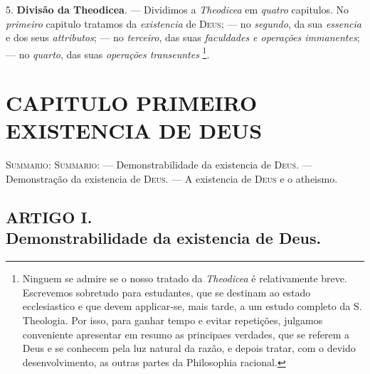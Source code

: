  5. \textbf{Divisão da Theodicea}. --- Dividimos a \emph{Theodicea} em \emph{quatro} capitulos. No \emph{primeiro} capitulo tratamos da \emph{existencia} de \textsc{Deus}; --- no \emph{segundo}, da sua \emph{essencia} e dos seus \emph{attributos}; --- no \emph{terceiro}, das suas \emph{faculdades e operações immanentes}; --- no \emph{quarto}, das suas \emph{operações transeuntes} \footnote{Ninguem se admire se o nosso tratado da \emph{Theodicea} é relativamente breve. Escrevemos sobretudo para estudantes, que se destinam ao estado ecclesiastico e que devem applicar-se, mais tarde, a um estudo completo da S. Theologia. Por isso, para ganhar tempo e evitar repetições, julgamos conveniente apresentar em resumo as principaes verdades, que se referem a Deus e se conhecem pela luz natural da razão, e depois tratar, com o devido desenvolvimento, as outras partes da Philosophia racional.}.


\chapter*{CAPITULO PRIMEIRO\\[0.3em]\large EXISTENCIA DE DEUS}

{\small\noindent\textsc{Summario}: \textsc{Summario:} --- Demonstrabilidade da existencia de \textsc{Deus}. --- Demonstração da existencia de \textsc{Deus}. --- A existencia de \textsc{Deus} e o atheismo.\par}


\section*{ARTIGO I.\\ Demonstrabilidade da existencia de Deus.}

